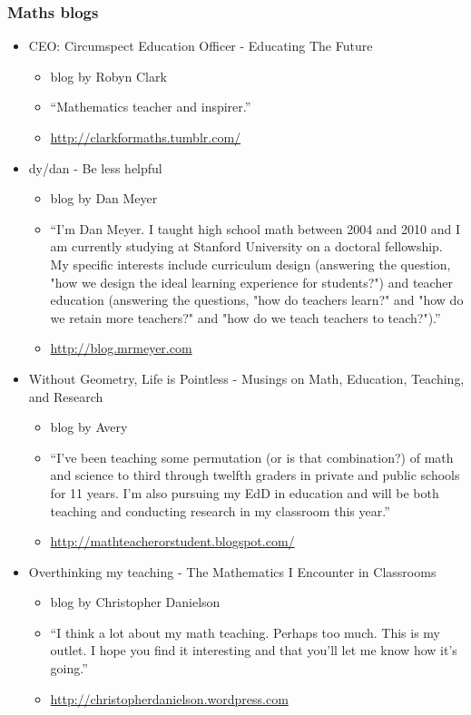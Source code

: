 \subsubsection{Maths blogs}
\begin{itemize}

\item CEO: Circumspect Education Officer - Educating The Future
\begin{itemize} [noitemsep]
 \item blog by Robyn Clark
\item “Mathematics teacher and inspirer.”
\item \underline{http://clarkformaths.tumblr.com/ }
\end{itemize}

\item dy/dan - Be less helpful
\begin{itemize} [noitemsep]
\item blog by Dan Meyer
\item “I'm Dan Meyer. I taught high school math between 2004 and 2010 and I am currently studying at Stanford University on a doctoral fellowship. My specific interests include curriculum design (answering the question, "how we design the ideal learning experience for students?") and teacher education (answering the questions, "how do teachers learn?" and "how do we retain more teachers?" and "how do we teach teachers to teach?").”
\item \underline{http://blog.mrmeyer.com }
\end{itemize}

\item Without Geometry, Life is Pointless - Musings on Math, Education, Teaching, and Research

\begin{itemize}[noitemsep]
 \item blog by Avery
\item “I've been teaching some permutation (or is that combination?) of math and science to third through twelfth graders in private and public schools for 11 years. I'm also pursuing my EdD in education and will be both teaching and conducting research in my classroom this year.”
\item \underline{ http://mathteacherorstudent.blogspot.com/ }
\end{itemize}

\item Overthinking my teaching - The Mathematics I Encounter in Classrooms
\begin{itemize}[noitemsep]
\item blog by Christopher Danielson
\item “I think a lot about my math teaching. Perhaps too much. This is my outlet. I hope you find it interesting and that you’ll let me know how it’s going.”
\item \underline{http://christopherdanielson.wordpress.com}
\end{itemize}


\end{itemize}
